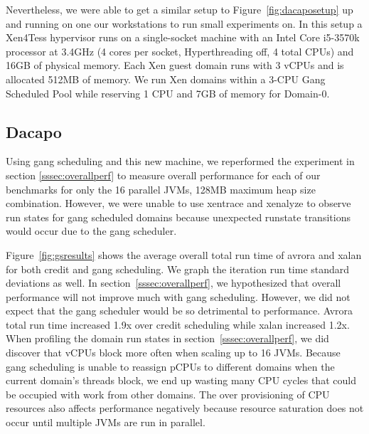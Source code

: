 \documentclass{sig-alternate}
\begin{document}
Nevertheless, we were able to get a similar setup to Figure~\ref{fig:dacaposetup} up and running on one our workstations to run small experiments on. In this setup a Xen4Tess hypervisor runs on a single-socket machine with an Intel Core i5-3570k processor at 3.4GHz (4 cores per socket, Hyperthreading off,  4 total CPUs) and 16GB of physical memory. Each Xen guest domain runs with 3 vCPUs and is allocated 512MB of memory. We run Xen domains within a 3-CPU Gang Scheduled Pool while reserving 1 CPU and 7GB of memory for Domain-0.

\subsection{Dacapo}
\begin{figure*}[t!]
\centering
{}
\caption{Overall performance and iteration standard deviation comparison of credit and gang scheduling}
\label{fig:gsresults}
\end{figure*}
Using gang scheduling and this new machine, we reperformed the experiment in section \ref{sssec:overallperf} to measure overall performance for each of our benchmarks for only the 16 parallel JVMs, 128MB maximum heap size combination. However, we were unable to use xentrace and xenalyze to observe run states for gang scheduled domains because unexpected runstate transitions would occur due to the gang scheduler.

Figure~\ref{fig:gsresults} shows the average overall total run time of avrora and xalan for both credit and gang scheduling. We graph the iteration run time standard deviations as well. In section~\ref{sssec:overallperf}, we hypothesized that overall performance will not improve much with gang scheduling. However, we did not expect that the gang scheduler would be so detrimental to performance. Avrora total run time increased 1.9x over credit scheduling while xalan increased 1.2x. When profiling the domain run states in section~\ref{sssec:overallperf}, we did discover that vCPUs block more often when scaling up to 16 JVMs. Because gang scheduling is unable to reassign pCPUs to different domains when the current domain's threads block, we end up wasting many CPU cycles that could be occupied with work from other domains. The over provisioning of CPU resources also affects performance negatively because resource saturation does not occur until multiple JVMs are run in parallel.
\end{document}
